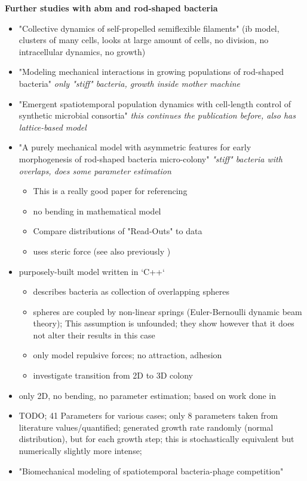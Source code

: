 \textbf{Further studies with \ac{abm} and rod-shaped bacteria}
\begin{itemize}
    \item \cite{Duman2018} "Collective dynamics of self-propelled semiflexible filaments"
        (ib model, clusters of many cells, looks at large amount of cells, no division,
        no intracellular dynamics, no growth)
    \item \cite{Winkle2017} "Modeling mechanical interactions in growing populations of
        rod-shaped bacteria" \textit{only "stiff" bacteria, growth inside mother machine}
    \item \cite{Winkle2021} "Emergent spatiotemporal population dynamics with cell-length
        control of synthetic microbial consortia" \textit{this continues the publication
        before, also has lattice-based model}
    \item \cite{Doumic2020} "A purely mechanical model with asymmetric features for early
        morphogenesis of rod-shaped bacteria micro-colony" \textit{"stiff" bacteria with
        overlaps, does some parameter estimation}
        \begin{itemize}
            \item This is a really good paper for referencing
            \item no bending in mathematical model
            \item Compare distributions of "Read-Outs" to data
            \item uses steric force (see also previously \cite{Trejo2013})
        \end{itemize}
    \item \cite{Grant2014} purposely-built model written in `C++`
        \begin{itemize}
            \item describes bacteria as collection of overlapping spheres
            \item spheres are coupled by non-linear springs (Euler-Bernoulli dynamic beam theory);
                This assumption is unfounded; they show however that it does not alter
                their results in this
                case
            \item only model repulsive forces; no attraction, adhesion
            \item investigate transition from 2D to 3D colony
        \end{itemize}
    \item \cite{Cho2007} only 2D, no bending, no parameter estimation; based on work done in
        \cite{Jnsson2005}
    \item \cite{Storck2014} TODO;
        41 Parameters for various cases;
        only 8 parameters taken from literature values/quantified;
        generated growth rate randomly (normal distribution), but for each growth step; this is
        stochastically equivalent but numerically slightly more intense;
    \item \cite{Valdez2025} "Biomechanical modeling of spatiotemporal bacteria-phage competition"
\end{itemize}

